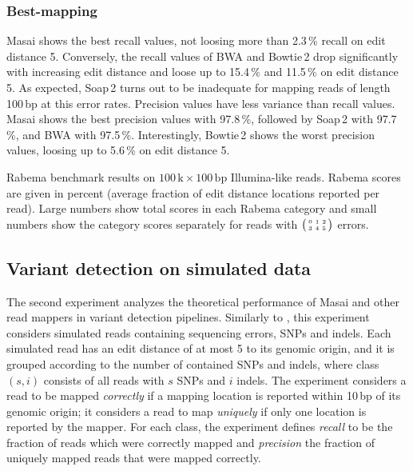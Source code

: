 \subsubsection{Best-mapping}
Masai shows the best recall values, not loosing more than 2.3\,\% recall on edit distance 5.
Conversely, the recall values of BWA and Bowtie\,2 drop significantly with increasing edit distance and loose up to 15.4\,\% and 11.5\,\% on edit distance 5.
As expected, Soap\,2 turns out to be inadequate for mapping reads of length 100\,bp at this error rates.
Precision values have less variance than recall values. Masai shows the best precision values with 97.8\,\%, followed by Soap\,2 with 97.7\,\%, and BWA with 97.5\,\%. Interestingly, Bowtie\,2 shows the worst precision values, loosing up to 5.6\,\% on edit distance 5.

\begin{table*}[t]
  \caption[Masai results in the Rabema benchmark]
  {
  \label{tab:masai:rabema}
    Rabema benchmark results on $100\,\text{k}\times 100\,\text{bp}$ Illumina-like reads.
    Rabema scores are given in percent (average fraction of edit distance locations reported per read).
    Large numbers show total scores in each Rabema category and small numbers show the category scores separately for reads with $\bigl(\begin{smallmatrix}\mbox{\tiny 0}&\mbox{\tiny 1}&\mbox{\tiny 2}\\\mbox{\tiny 3}&\mbox{\tiny 4}&\mbox{\tiny 5}\end{smallmatrix}\bigr)$ errors.
    }
  \vspace{-3mm}
  \center
  \sffamily
  \footnotesize
  \resizebox{0.95\textwidth}{!}
  {
	\renewcommand{\tabcolsep}{0.8ex}
	
  }
\end{table*}

\subsection{Variant detection on simulated data}
\label{masai:evaluation:variant}

The second experiment analyzes the theoretical performance of Masai and other read mappers in variant detection pipelines.
Similarly to \citep{David2011}, this experiment considers simulated reads containing sequencing errors, SNPs and indels.
Each simulated read has an edit distance of at most 5 to its genomic origin, and it is grouped according to the number of contained SNPs and indels, where class $(s,i)$ consists of all reads with $s$ SNPs and $i$ indels.
The experiment considers a read to be mapped \emph{correctly} if a mapping location is reported within 10\,bp of its genomic origin;
it considers a read to map \emph{uniquely} if only one location is reported by the mapper.
For each class, the experiment defines \emph{recall} to be the fraction of reads which were correctly mapped and \emph{precision} the fraction of uniquely mapped reads that were mapped correctly.

